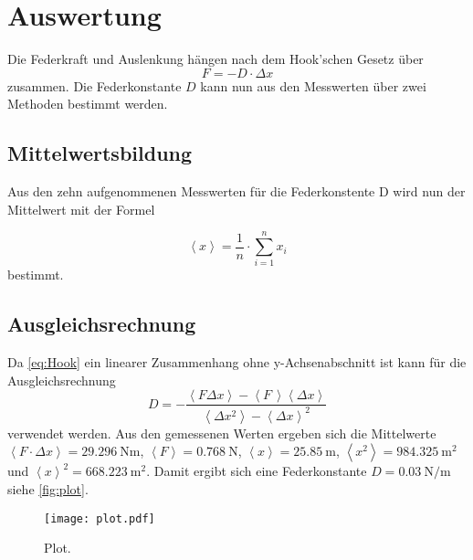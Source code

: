 \section{Auswertung}
\label{sec:Auswertung}

Die Federkraft und Auslenkung hängen nach dem Hook'schen Gesetz über
\begin{equation}
  \label{eq:Hook}
  F = - D \cdot \Delta x
\end{equation}
zusammen.
Die Federkonstante $D$ kann nun aus den Messwerten über zwei Methoden bestimmt werden.

\subsection{Mittelwertsbildung}
Aus den zehn aufgenommenen Messwerten für die Federkonstente D wird nun der Mittelwert mit der Formel

\begin{equation}
  \label{eq:Mittelwert}
  \left< x \right> = \frac{1}{n} \cdot \sum_{i=1}^{n} x_i
\end{equation}
bestimmt. 

\subsection{Ausgleichsrechnung}

Da \eqref{eq:Hook} ein linearer Zusammenhang ohne y-Achsenabschnitt ist kann für die Ausgleichsrechnung
\begin{equation}
  \label{eq:Lin-Ausgleich}
  D = - \frac
  {\left< F \Delta x \right> - \left< F \, \right> \left< \Delta x \right>}
  {\left< \Delta x^2 \right> - \left< \Delta x \right> ^2}
\end{equation}
verwendet werden.
Aus den gemessenen Werten ergeben sich die Mittelwerte $\left< F \cdot \Delta x \right> = \SI{29.296}{\newton\meter}$, $\left< F \right> = \SI{0.768}{\newton}$, $\left< x \right> = \SI{25.85}{\meter}$, $\left< x^2 \right> = \SI{984.325}{\meter\squared}$ und $\left< x \right> ^2 = \SI{668.223}{\meter\squared}$.
Damit ergibt sich eine Federkonstante $D=\SI{0.03}{\newton\per\meter}$ siehe \autoref{fig:plot}.

\begin{figure}
  \centering
  \texttt{[image: plot.pdf]}
  \caption{Plot.}
  \label{fig:plot}
\end{figure}

